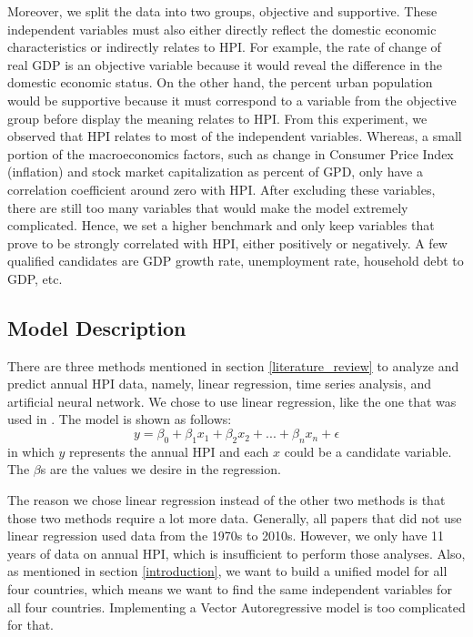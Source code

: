 \documentclass[11pt]{article}
\begin{document}
Moreover, we split the data into two groups, objective and supportive. These independent variables must also either directly reflect the domestic economic characteristics or indirectly relates to HPI. For example, the rate of change of real GDP is an objective variable because it would reveal the difference in the domestic economic status. On the other hand, the percent urban population would be supportive because it must correspond to a variable from the objective group before display the meaning relates to HPI. From this experiment, we observed that HPI relates to most of the independent variables. Whereas, a small portion of the macroeconomics factors, such as change in Consumer Price Index (inflation) and stock market capitalization as percent of GPD, only have a correlation coefficient around zero with HPI. After excluding these variables, there are still too many variables that would make the model extremely complicated. Hence, we set a higher benchmark and only keep variables that prove to be strongly correlated with HPI, either positively or negatively. A few qualified candidates are GDP growth rate, unemployment rate, household debt to GDP, etc. 


\subsection{Model Description}\label{model_description}
There are three methods mentioned in section \ref{literature_review} to analyze and predict annual HPI data, namely, linear regression, time series analysis, and artificial neural network. We chose to use linear regression, like the one that was used in \citet{GASPARENIENE2016122}. The model is shown as follows:
$$y = \beta_0 + \beta_1x_1 + \beta_2x_2 + ... + \beta_nx_n + \epsilon$$
in which $y$ represents the annual HPI and each $x$ could be a candidate variable. The $\beta$s are the values we desire in the regression.

The reason we chose linear regression instead of the other two methods is that those two methods require a lot more data. Generally, all papers that did not use linear regression used data from the 1970s to 2010s. However, we only have 11 years of data on annual HPI, which is insufficient to perform those analyses. Also, as mentioned in section \ref{introduction}, we want to build a unified model for all four countries, which means we want to find the same independent variables for all four countries. Implementing a Vector Autoregressive model is too complicated for that.
\end{document}

